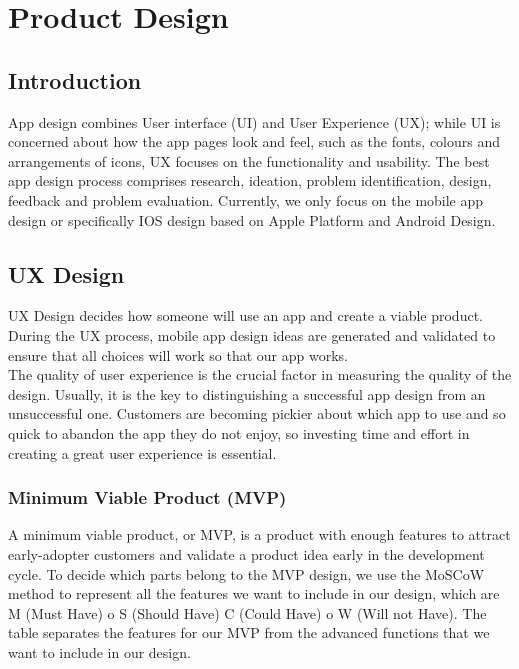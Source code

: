 


\chapter{Product Design} %
\label{Chapter2} %

\section{Introduction}
App design combines User interface (UI) and User Experience (UX); while UI is concerned about how the app pages look and feel, such as the fonts, colours and arrangements of icons, UX focuses on the functionality and usability. The best app design process comprises research, 
ideation, problem identification, design, feedback and problem evaluation. Currently, we only focus on the mobile app design or specifically IOS design based on Apple Platform and Android Design. 
\section{UX Design}
UX Design decides how someone will use an app and create a viable product. During the UX process, mobile app design ideas are generated and validated to ensure that all choices will work so that our app works. 
\\The quality of user experience is the crucial factor in measuring the quality of the design. Usually, it is the key to distinguishing a successful app design from an unsuccessful one. 
Customers are becoming pickier about which app to use and so quick to abandon the app they do not enjoy, so investing time and effort in creating a great user experience is essential.
\subsection{Minimum Viable Product (MVP)}
\label{sec:UImvp}
A minimum viable product, or MVP, is a product with enough features to attract early-adopter customers and validate a product idea early in the development cycle. To decide which parts belong to the MVP design, we use the MoSCoW method to represent all the features we want to include in our design, which are M (Must Have) o S (Should Have) C (Could Have) o W (Will not Have). 
The table separates the features for our MVP from the advanced functions that we want to include in our design.

